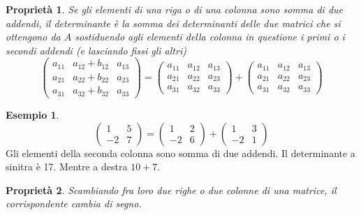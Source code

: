 \documentclass{book}
\theoremstyle{definition}
\newtheorem{es}{Esempio}[section]
\theoremstyle{plain}
\newtheorem{pro}{Proprietà}[section]
\begin{document}
\begin{pro}
  \label{pro:prodeldet4}
  Se gli elementi di una riga o di una colonna sono somma di due
  addendi, il determinante è la somma dei determinanti delle due matrici
  che si ottengono da $A$ sostiduendo agli elementi della colonna in
  questione i primi o i secondi addendi (e lasciando fissi gli altri)
  \begin{equation*}
    \begin{pmatrix}
      a_{11}& a_{12} + b_{12} & a_{13}\\
      a_{21}& a_{22} + b_{22} & a_{23}\\
      a_{31}& a_{32} + b_{32} & a_{33}
    \end{pmatrix}=
    \begin{pmatrix}
      a_{11} & a_{12} & a_{13}\\
      a_{21} & a_{22} & a_{23}\\
      a_{31} & a_{32} & a_{33}
    \end{pmatrix}
    +
    \begin{pmatrix}
      a_{11} & a_{12} & a_{13}\\
      a_{21} & a_{22} & a_{23}\\
      a_{31} & a_{32} & a_{33}
    \end{pmatrix}
  \end{equation*}
\end{pro}
\begin{es}
  \begin{equation*}
    \begin{pmatrix}
      1 & 5\\
      -2 & 7
    \end{pmatrix}=
    \begin{pmatrix}
      1 & 2\\
      -2 & 6
    \end{pmatrix}+
    \begin{pmatrix}
      1 & 3 \\
      -2 & 1
    \end{pmatrix}
  \end{equation*}
  Gli elementi della seconda colonna sono somma di due addendi. Il
  determinante a sinitra è 17. Mentre a destra $10+7$.
\end{es}
\begin{pro}
  \label{pro:prodeldet5}
  Scambiando fra loro due righe o due colonne di una matrice, il
  corrispondente cambia di segno.
\end{pro}
\end{document}
